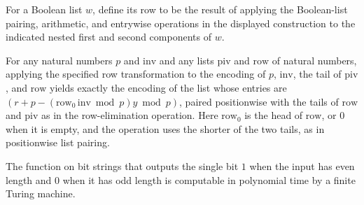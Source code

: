 \begin{definition}
\label{Complexity.BinArith.rowW}
\leanok
{}
For a Boolean list $w$, define its row to be the result of applying the Boolean-list
pairing, arithmetic, and entrywise operations in the displayed construction to the
indicated nested first and second components of $w$.
\end{definition}

\begin{theorem}
\label{Complexity.BinArith.rowW_eq}
\leanok
{}
For any natural numbers $p$ and $\mathrm{inv}$ and any lists $\mathrm{piv}$ and
$\mathrm{row}$ of natural numbers, applying the specified row transformation to the
encoding of $p$, $\mathrm{inv}$, the tail of $\mathrm{piv}$, and $\mathrm{row}$ yields
exactly the encoding of the list whose entries are
$(r+p-(\mathrm{row}_0\,\mathrm{inv}\bmod p)y\bmod p)$, paired positionwise with the
tails of $\mathrm{row}$ and $\mathrm{piv}$ as in the row-elimination operation. Here
$\mathrm{row}_0$ is the head of $\mathrm{row}$, or $0$ when it is empty, and the
operation uses the shorter of the two tails, as in positionwise list pairing.
\end{theorem}

\begin{theorem}
\label{Complexity.BinArith.polyTimeComputable_evenLength}
\leanok
{}
The function on bit strings that outputs the single bit $1$ when the input has even
length and $0$ when it has odd length is computable in polynomial time by a finite
Turing machine.
\end{theorem}

